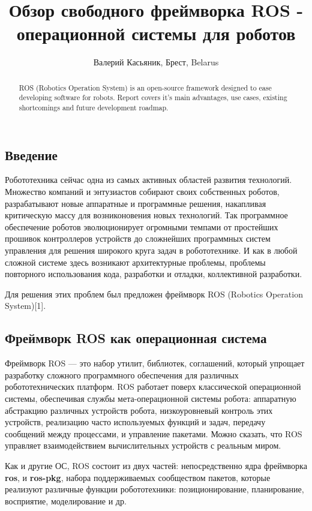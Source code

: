 \documentclass[10pt, a5paper]{article}
\begin{document}
\title{Обзор свободного фреймворка ROS - операционной системы для роботов}
\author{Валерий Касьяник, Брест, Belarus}
\maketitle
\begin{abstract}
ROS (Robotics Operation System) is an open-source framework designed to ease developing software for robots. Report covers it's main  advantages, use cases, existing shortcomings and future development roadmap.
\end{abstract}
\subsection*{Введение}

Робототехника сейчас одна из самых активных областей развития технологий. Множество компаний и  энтузиастов собирают своих собственных роботов, разрабатывают новые аппаратные и программные решения, накапливая критическую массу для возниконовения новых технологий. Так программное обеспечение роботов эволюционирует огромными темпами от простейших прошивок контроллеров устройств до сложнейших программных систем управления для решения широкого круга задач в робототехнике. И как в любой сложной системе здесь возникают архитектурные проблемы, проблемы повторного использования кода, разработки и отладки, коллективной разработки.

Для решения этих проблем был предложен фреймворк ROS  (Robotics Operation System)[1].

\subsection*{Фреймворк ROS как операционная система}

Фреймворк ROS — это набор утилит, библиотек, соглашений, который упрощает разработку сложного программного обеспечения для различных робототехнических платформ. ROS работает поверх классической операционной системы, обеспечивая службы мета-операционной системы робота: аппаратную абстракцию различных устройств робота, низкоуровневый контроль этих устройств, реализацию часто используемых функций и задач, передачу сообщений между процессами, и управление пакетами. Можно сказать, что ROS управляет взаимодействием вычислительных устройств с реальным миром.

Как и другие ОС, ROS состоит из двух частей: непосредственно ядра фреймворка \textbf{ros}, и \textbf{ros-pkg}, набора поддерживаемых сообществом пакетов, которые реализуют различные функции робототехники: позиционирование, планирование, восприятие, моделирование и др.
\end{document}
